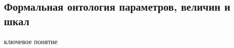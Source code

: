 \begin{SCn}
\begin{SCn}
\begin{comment}
\scnheader{соответствие*}
\scnidtf{наличие соответствия*}
\scniselement{бинарное отношение}
\begin{scnsubdividing}
	\scnitem{соответствие между непересекающимися множествами*}
	\scnitem{соответствие между строго пересекающимися множествами*}
	\scnitem{соответствие, область отправления и область прибытия которого совпадают*}
\end{scnsubdividing}
\begin{scnsubdividing}
	\scnitem{всюду определенное соответствие*}
	\scnitem{частично определенное соответствие*}
\end{scnsubdividing}
\begin{scnsubdividing}
	\scnitem{сюръекция*}
	\scnitem{несюръективное соответствие*}
\end{scnsubdividing}
\begin{scnsubdividing}
	\scnitem{однозначное соответствие*}
	\scnitem{неоднозначное соответствие*}
\end{scnsubdividing}
\scntext{определение}{\textbf{\textit{соответствие*}} --- \textit{бинарное ориентированное отношение}, каждая пара которого связывает два множества и указывает на наличие некоторого отношения, связывающего элементы этих двух множеств.}
	
	
\scnheader{область отправления\scnrolesign}
\scnidtf{область отправления соответствия\scnrolesign}
\scnidtf{область определения соответствия\scnrolesign}
\scnidtf{первый компонент пары в отношении соответствия\scnrolesign}
\scniselement{ролевое отношение}
\scntext{определение}{\textbf{\textit{область отправления\scnrolesign}} --- \textit{ролевое отношение}, указывающее на первый компонент пары в рамках отношения \textit{соответствие*}.}
	
\scnheader{область прибытия\scnrolesign}
\scnidtf{область прибытия соответствия\scnrolesign}
\scnidtf{область значений соответствия\scnrolesign}
\scniselement{ролевое отношение}
\scntext{определение}{\textbf{\textit{область прибытия\scnrolesign}} --- \textit{ролевое отношение}, указывающее на второй компонент пары в рамках отношения \textit{соответствие*}.}
\end{SCn}


\end{comment}
\section{Формальная онтология параметров, величин и шкал}
\label{sec_top_ontologies_params}

\begin{SCn}
\begin{scnrelfromlist}{ключевое понятие}
\end{scnrelfromlist}


\end{SCn}
\end{SCn}
\end{SCn}
